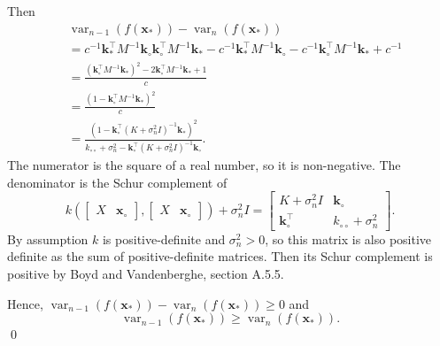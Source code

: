\documentclass{article}
\DeclareMathOperator{\var}{var}
\newcommand{\bfk}{\mathbf{k}}
\newcommand{\bfx}{\mathbf{x}}
\begin{document}
  Then \begin{align*}
    &\var_{n-1}(f(\bfx_*)) - \var_n(f(\bfx_*)) \\
    &= c^{-1}\bfk_*^\top M^{-1}\bfk_\circ\bfk_\circ^\top M^{-1} \bfk_*
    - c^{-1} \bfk_*^\top M^{-1} \bfk_\circ
    - c^{-1} \bfk_\circ^\top M^{-1} \bfk_*
    + c^{-1} \\
    &= \frac{\left(\bfk_\circ^\top M^{-1}\bfk_*\right)^2
             - 2\bfk_\circ^\top M^{-1}\bfk_*
             + 1}{c} \\
    &= \frac{\left(1 - \bfk_\circ^\top M^{-1}\bfk_*\right)^2}{c} \\
    &= \frac{\left(1 - \bfk_\circ^\top \left(K + \sigma^2_n I\right)^{-1}
    \bfk_*\right)^2}{
    k_{\circ\circ} + \sigma^2_n
    - \bfk_\circ^\top \left(K + \sigma^2_n I\right)^{-1}\bfk_\circ} \text{.}
  \end{align*} The numerator is the square of a real number, so it is
  non-negative. The denominator is the Schur complement of \[
    k\left(\begin{bmatrix}X&\bfx_\circ\end{bmatrix},
    \begin{bmatrix}X&\bfx_\circ\end{bmatrix}\right) + \sigma_n^2 I
    = \begin{bmatrix}
    K + \sigma^2_n I & \bfk_\circ \\
    \bfk_\circ^\top & k_{\circ\circ} + \sigma^2_n
    \end{bmatrix} \text{.}
  \] By assumption $k$ is positive-definite and $\sigma_n^2 > 0$, so this matrix
  is also positive definite as the sum of positive-definite matrices. Then its
  Schur complement is positive by Boyd and Vandenberghe, section A.5.5.

  Hence, $\var_{n-1}(f(\bfx_*)) - \var_n(f(\bfx_*)) \geq 0$ and \[
      \var_{n-1}(f(\bfx_*)) \geq \var_n(f(\bfx_*)) \text{.}
  \]\qed
\end{document}
